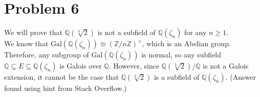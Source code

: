 \documentclass[10pt]{extarticle}
\newcommand{\Q}{\mathbb{Q}}
\newcommand{\Z}{\mathbb{Z}}
\begin{document}
\begin{enumerate}[(a)]
\begin{center}
      \end{center}
  \end{enumerate}
  \section{Problem 6}%
  We will prove that $\Q(\sqrt[3]{2})$ is not a subfield of $\Q(\zeta_n)$ for any $n\geq 1$.\\

  We know that $\text{Gal}(\Q(\zeta_n))\cong \left(\Z/n\Z\right)^{\times}$, which is an Abelian group. Therefore, any subgroup of $\text{Gal}\left(\Q(\zeta_n)\right)$ is normal, so any subfield $\Q \subseteq E\subseteq \Q(\zeta_n)$ is Galois over $\Q$. However, since $\Q(\sqrt[3]{2})/\Q$ is not a Galois extension, it cannot be the case that $\Q(\sqrt[3]{2})$ is a subfield of $\Q(\zeta_n)$. (Answer found using hint from Stack Overflow.)
\end{document}
